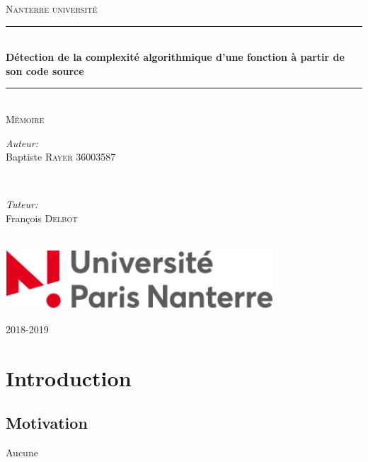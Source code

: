 \documentclass[12pt, twoside, openright]{report}
\begin{document}
\begin{titlepage}

\newcommand{\HRule}{\rule{\linewidth}{0.5mm}} 
\center
 

\textsc{\LARGE Nanterre université}\\[1.5cm]
\HRule \\[0.4cm]
{ \huge \bfseries Détection de la complexité algorithmique d'une fonction à partir de son code source }\\[0.4cm]
\HRule \\[1.5cm]
 \textsc{\Large Mémoire }\\[0.5cm]

\begin{minipage}{0.4\textwidth}
\begin{center} \large
\emph{Auteur:}\\
Baptiste \textsc{Rayer} 36003587
\end{center}
\end{minipage}\\[0.5cm]

\begin{minipage}{0.4\textwidth}
\begin{center} \large
\emph{Tuteur:} \\
François \textsc{Delbot}
\end{center}
\end{minipage}\\[4cm]

\includegraphics[width=10cm,height=2.25cm]{img/UPN.jpg}
\\[2cm]
\begin{center}
2018-2019    
\end{center}


\vfill 

\end{titlepage}

\newpage


\chapter{Introduction}

\section{Motivation}
Aucune 
\end{document}
